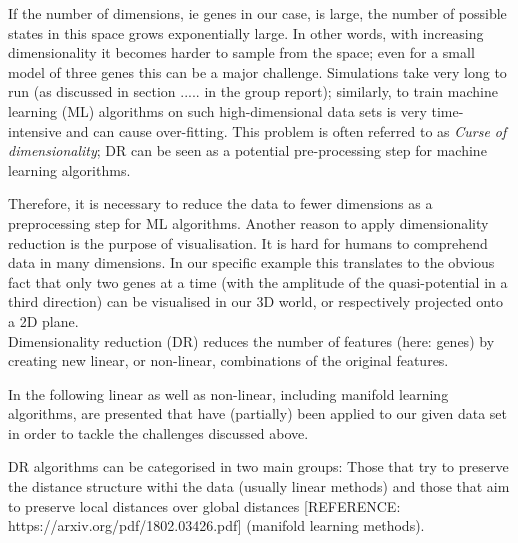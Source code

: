 \documentclass[journal, a4paper]{IEEEtran}
\begin{document}


If the number of dimensions, ie genes in our case, is large, the number of possible states in this space grows exponentially large. In other words, with increasing dimensionality it becomes harder to sample from the space; even for a small model of three genes this can be a major challenge. Simulations take very long to run (as discussed in section ..... in the group report); similarly, to train machine learning (ML) algorithms on such high-dimensional data sets is very time-intensive and can cause over-fitting. %
This problem is often referred to as \textit{Curse of dimensionality}; DR can be seen as a potential pre-processing step for machine learning algorithms.

Therefore, it is necessary to reduce the data to fewer dimensions as a preprocessing step for ML algorithms.
Another reason to apply dimensionality reduction is the purpose of visualisation. It is hard for humans to comprehend data in many dimensions. In our specific example this translates to the obvious fact that only two genes at a time (with the amplitude of the quasi-potential in a third direction) can be visualised in our 3D world, or respectively projected onto a 2D plane.\\

Dimensionality reduction (DR) reduces the number of features (here: genes) by creating new linear, or non-linear, combinations of the original features.



In the following linear as well as non-linear, including manifold learning algorithms, are presented that have (partially) been applied to our given data set in order to tackle the challenges discussed above.

DR algorithms can be categorised in two main groups: Those that try to preserve the distance structure withi the data (usually linear methods) and those that aim to preserve local distances over global distances [REFERENCE: https://arxiv.org/pdf/1802.03426.pdf] (manifold learning methods).

\end{document}
